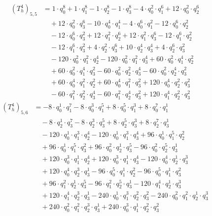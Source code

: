 \begin{align*}(T_{h}^4)_{5,5}&=1\cdot q_0^{8}+1\cdot q_1^{8}-1\cdot q_2^{8}-1\cdot q_3^{8}-4\cdot q_0^{2}\cdot q_1^{6}+12\cdot q_0^{2}\cdot q_2^{6}\\
&\quad +12\cdot q_0^{2}\cdot q_3^{6}-10\cdot q_0^{4}\cdot q_1^{4}-4\cdot q_0^{6}\cdot q_1^{2}-12\cdot q_0^{6}\cdot q_2^{2}\\
&\quad -12\cdot q_0^{6}\cdot q_3^{2}+12\cdot q_1^{2}\cdot q_2^{6}+12\cdot q_1^{2}\cdot q_3^{6}-12\cdot q_1^{6}\cdot q_2^{2}\\
&\quad -12\cdot q_1^{6}\cdot q_3^{2}+4\cdot q_2^{2}\cdot q_3^{6}+10\cdot q_2^{4}\cdot q_3^{4}+4\cdot q_2^{6}\cdot q_3^{2}\\
&\quad -120\cdot q_0^{2}\cdot q_1^{2}\cdot q_2^{4}-120\cdot q_0^{2}\cdot q_1^{2}\cdot q_3^{4}+60\cdot q_0^{2}\cdot q_1^{4}\cdot q_2^{2}\\
&\quad +60\cdot q_0^{2}\cdot q_1^{4}\cdot q_3^{2}-60\cdot q_0^{2}\cdot q_2^{2}\cdot q_3^{4}-60\cdot q_0^{2}\cdot q_2^{4}\cdot q_3^{2}\\
&\quad +60\cdot q_0^{4}\cdot q_1^{2}\cdot q_2^{2}+60\cdot q_0^{4}\cdot q_1^{2}\cdot q_3^{2}+120\cdot q_0^{4}\cdot q_2^{2}\cdot q_3^{2}\\
&\quad -60\cdot q_1^{2}\cdot q_2^{2}\cdot q_3^{4}-60\cdot q_1^{2}\cdot q_2^{4}\cdot q_3^{2}+120\cdot q_1^{4}\cdot q_2^{2}\cdot q_3^{2}\end{align*}
\begin{align*}(T_{h}^4)_{5,6}&=-8\cdot q_0^{1}\cdot q_1^{7}-8\cdot q_0^{3}\cdot q_1^{5}+8\cdot q_0^{5}\cdot q_1^{3}+8\cdot q_0^{7}\cdot q_1^{1}\\
&\quad -8\cdot q_2^{1}\cdot q_3^{7}-8\cdot q_2^{3}\cdot q_3^{5}+8\cdot q_2^{5}\cdot q_3^{3}+8\cdot q_2^{7}\cdot q_3^{1}\\
&\quad -120\cdot q_0^{1}\cdot q_1^{3}\cdot q_2^{4}-120\cdot q_0^{1}\cdot q_1^{3}\cdot q_3^{4}+96\cdot q_0^{1}\cdot q_1^{5}\cdot q_2^{2}\\
&\quad +96\cdot q_0^{1}\cdot q_1^{5}\cdot q_3^{2}+96\cdot q_0^{2}\cdot q_2^{1}\cdot q_3^{5}-96\cdot q_0^{2}\cdot q_2^{5}\cdot q_3^{1}\\
&\quad +120\cdot q_0^{3}\cdot q_1^{1}\cdot q_2^{4}+120\cdot q_0^{3}\cdot q_1^{1}\cdot q_3^{4}-120\cdot q_0^{4}\cdot q_2^{1}\cdot q_3^{3}\\
&\quad +120\cdot q_0^{4}\cdot q_2^{3}\cdot q_3^{1}-96\cdot q_0^{5}\cdot q_1^{1}\cdot q_2^{2}-96\cdot q_0^{5}\cdot q_1^{1}\cdot q_3^{2}\\
&\quad +96\cdot q_1^{2}\cdot q_2^{1}\cdot q_3^{5}-96\cdot q_1^{2}\cdot q_2^{5}\cdot q_3^{1}-120\cdot q_1^{4}\cdot q_2^{1}\cdot q_3^{3}\\
&\quad +120\cdot q_1^{4}\cdot q_2^{3}\cdot q_3^{1}-240\cdot q_0^{1}\cdot q_1^{3}\cdot q_2^{2}\cdot q_3^{2}-240\cdot q_0^{2}\cdot q_1^{2}\cdot q_2^{1}\cdot q_3^{3}\\
&\quad +240\cdot q_0^{2}\cdot q_1^{2}\cdot q_2^{3}\cdot q_3^{1}+240\cdot q_0^{3}\cdot q_1^{1}\cdot q_2^{2}\cdot q_3^{2}\end{align*}

